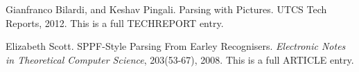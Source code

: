\documentclass{sigplanconf}
\begin{document}




\begin{thebibliography}{}
\softraggedright

Gianfranco Bilardi, and Keshav Pingali. Parsing with Pictures. UTCS Tech Reports, 2012. This is a full TECHREPORT entry.

Elizabeth Scott. SPPF-Style Parsing From Earley Recognisers. \textit{Electronic Notes in Theoretical Computer Science}, 203(53-67), 2008. This is a full ARTICLE entry.

\end{thebibliography}
\end{document}
